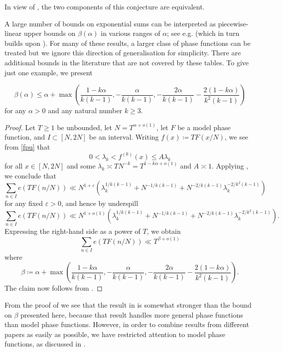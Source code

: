 \documentclass[a4paper, 10pt]{amsart}
\newcommand{\eps}{\varepsilon}
\begin{document}
In view of , the two components of this conjecture are equivalent.

A large number of bounds on exponential sums can be interpreted as piecewise-linear upper bounds on $\beta(\alpha)$ in various ranges of $\alpha$; see e.g. \cite[Table 3]{trudgian-yang} (which in turn builds upon \cite[Tables 17.1, 19.2]{huxley_area_1996}). For many of these results, a larger class of phase functions can be treated but we ignore this direction of generalisation for simplicity.  There are additional bounds in the literature that are not covered by these tables.  To give just one example, we present

\begin{lemma}\label{heath-brown-2017}
$$ \beta(\alpha) \leq \alpha + \max\left( \frac{1-k\alpha}{k(k-1)}, -\frac{\alpha}{k(k-1)}, -\frac{2\alpha}{k(k-1)} - \frac{2(1-k\alpha)}{k^2(k-1)}\right)$$
for any $\alpha>0$ and any natural number $k \geq 3$.
\end{lemma}

\begin{proof}
Let $T \geq 1$ be unbounded, let $N = T^{\alpha+o(1)}$, let $F$ be a model phase function, and $I \subset [N, 2N]$ be an interval.  Writing $f(x) \coloneqq TF(x/N)$, we see from \eqref{fpu} that
$$ 0 < \lambda_k < f^{(k)}(x) \leq A \lambda_k$$
for all $x \in [N,2N]$ and some $\lambda_k \asymp T N^{-k} = T^{1-k\alpha+o(1)}$ and $A \asymp 1$.  Applying \cite[Theorem 1]{heathbrown_new_2017}, we conclude that
$$ \sum_{n \in I} e(T F(n/N)) \ll N^{1+\eps} ( \lambda_k^{1/k(k-1)} +N^{-1/k(k-1)} + N^{-2/k(k-1)} \lambda_k^{-2/k^2(k-1)})$$
for any fixed $\eps>0$, and hence by underspill
$$ \sum_{n \in I} e(T F(n/N)) \ll N^{1+o(1)} ( \lambda_k^{1/k(k-1)} +N^{-1/k(k-1)} + N^{-2/k(k-1)} \lambda_k^{-2/k^2(k-1)}).$$
Expressing the right-hand side as a power of $T$, we obtain
$$ \sum_{n \in I} e(T F(n/N)) \ll T^{\beta+o(1)}$$
where
$$ \beta \coloneqq \alpha + \max\left( \frac{1-k\alpha}{k(k-1)}, -\frac{\alpha}{k(k-1)}, -\frac{2\alpha}{k(k-1)} - \frac{2(1-k\alpha)}{k^2(k-1)}\right).$$
The claim now follows from .
\end{proof}

\begin{remark}
From the proof of  we see that the result in \cite[Theorem 1]{heathbrown_new_2017} is somewhat stronger than the bound on $\beta$ presented here, because that result handles more general phase functions than model phase functions.  However, in order to combine results from different papers as easily as possible, we have restricted attention to model phase functions, as discussed in .
\end{remark}
\end{document}
